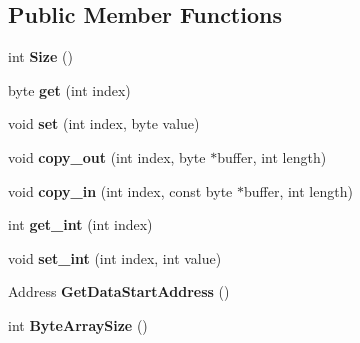 \subsection*{Public Member Functions}
\begin{DoxyCompactItemize}
\item 
int {\bfseries Size} ()\hypertarget{classv8_1_1internal_1_1_byte_array_a738020faf50daf7fb95d4d0ef9fc8731}{}\label{classv8_1_1internal_1_1_byte_array_a738020faf50daf7fb95d4d0ef9fc8731}

\item 
byte {\bfseries get} (int index)\hypertarget{classv8_1_1internal_1_1_byte_array_aef7f1d8ba217aaa3c4b4e690928f8d4f}{}\label{classv8_1_1internal_1_1_byte_array_aef7f1d8ba217aaa3c4b4e690928f8d4f}

\item 
void {\bfseries set} (int index, byte value)\hypertarget{classv8_1_1internal_1_1_byte_array_ad008d43b0348efd99a740d495808ad6c}{}\label{classv8_1_1internal_1_1_byte_array_ad008d43b0348efd99a740d495808ad6c}

\item 
void {\bfseries copy\+\_\+out} (int index, byte $\ast$buffer, int length)\hypertarget{classv8_1_1internal_1_1_byte_array_a325c12a21b6e31f4afcd2d5d2943d7c6}{}\label{classv8_1_1internal_1_1_byte_array_a325c12a21b6e31f4afcd2d5d2943d7c6}

\item 
void {\bfseries copy\+\_\+in} (int index, const byte $\ast$buffer, int length)\hypertarget{classv8_1_1internal_1_1_byte_array_ab0169c807cef60b07795995a53ea6cea}{}\label{classv8_1_1internal_1_1_byte_array_ab0169c807cef60b07795995a53ea6cea}

\item 
int {\bfseries get\+\_\+int} (int index)\hypertarget{classv8_1_1internal_1_1_byte_array_a451a1d97de1b1dbba8a8dd238d28d0dd}{}\label{classv8_1_1internal_1_1_byte_array_a451a1d97de1b1dbba8a8dd238d28d0dd}

\item 
void {\bfseries set\+\_\+int} (int index, int value)\hypertarget{classv8_1_1internal_1_1_byte_array_a73957a07e9d9560fb74798abaedf01c6}{}\label{classv8_1_1internal_1_1_byte_array_a73957a07e9d9560fb74798abaedf01c6}

\item 
Address {\bfseries Get\+Data\+Start\+Address} ()\hypertarget{classv8_1_1internal_1_1_byte_array_adff402fb5d35ec6b54583c9cad16c462}{}\label{classv8_1_1internal_1_1_byte_array_adff402fb5d35ec6b54583c9cad16c462}

\item 
int {\bfseries Byte\+Array\+Size} ()\hypertarget{classv8_1_1internal_1_1_byte_array_a64c9a5f6345c629889a3ddc101514e2a}{}\label{classv8_1_1internal_1_1_byte_array_a64c9a5f6345c629889a3ddc101514e2a}

\end{DoxyCompactItemize}
